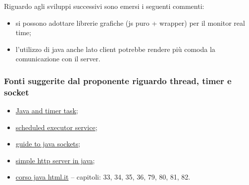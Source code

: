     Riguardo agli sviluppi successivi sono emersi i seguenti commenti:
    \begin{itemize}
        \item si possono adottare librerie grafiche (js puro + wrapper) per il monitor real time;
        \item l'utilizzo di java anche lato client potrebbe rendere più comoda la comunicazione con il server.
    \end{itemize}

    \subsubsection{Fonti suggerite dal proponente riguardo thread, timer e socket}
        \begin{itemize}
            \item \href{https://www.baeldung.com/java-timer-and-timertask}{Java and timer task};
            \item \href{https://www.adam-bien.com/roller/abien/entry/scheduledexecutorservice\_a\_timertask\_alternative}{scheduled executor service};
            \item \href{https://www.baeldung.com/a-guide-to-java-sockets}{guide to java sockets};
            \item \href{https://dzone.com/articles/simple-http-server-in-java}{simple http server in java};
            \item \href{https://www.html.it/guide/guida-java/}{corso java html.it}
                \subitem -- capitoli: 33, 34, 35, 36, 79, 80, 81, 82.
        \end{itemize}
